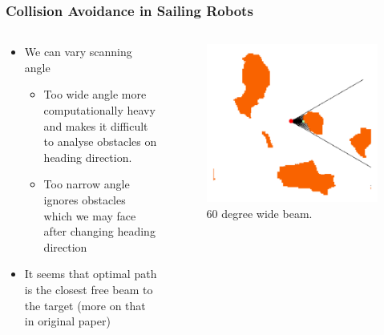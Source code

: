 \documentclass[
    11pt, %
    aspectratio=169, %
]{beamer}
\begin{document}
\begin{frame}
    \frametitle{Collision Avoidance in Sailing Robots}

    \begin{columns}[c]
        \begin{column}{0.5\textwidth}
            \begin{itemize}
                \item We can vary scanning angle
                \begin{itemize}
                    \item Too wide angle more computationally heavy and makes
                    it difficult to analyse obstacles on heading direction.
                    \item Too narrow angle ignores obstacles which we may face after
                    changing heading direction
                \end{itemize}
                \item It seems that optimal path is the closest free beam to the target (more on that in original paper)
            \end{itemize}
        \end{column}
        \begin{column}{0.5\textwidth}
            \begin{figure}
                \includegraphics[scale=0.25]{assets/casr-angle-example.png}
                \caption{60 degree wide beam.}
            \end{figure}
        \end{column}
    \end{columns}
\end{frame}
\end{document}

